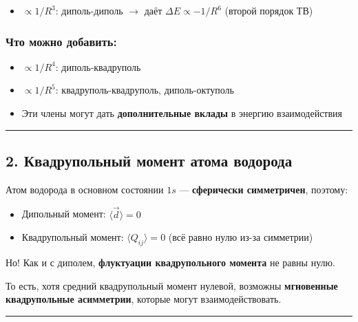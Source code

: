 \documentclass[11pt]{article}
\providecommand{\tightlist}{%
      \setlength{\itemsep}{0pt}\setlength{\parskip}{0pt}}
\begin{document}
\begin{itemize}
\tightlist
\item
  \(\propto 1/R^3\): диполь-диполь $\rightarrow$ даёт
  \(\Delta E \propto -1/R^6\) (второй порядок ТВ)
\end{itemize}

\subsubsection{Что можно
добавить:}\label{ux447ux442ux43e-ux43cux43eux436ux43dux43e-ux434ux43eux431ux430ux432ux438ux442ux44c}

\begin{itemize}
\tightlist
\item
  \(\propto 1/R^4\): диполь-квадруполь
\item
  \(\propto 1/R^5\): квадруполь-квадруполь, диполь-октуполь
\item
  Эти члены могут дать \textbf{дополнительные вклады} в энергию
  взаимодействия
\end{itemize}

\begin{center}\rule{0.5\linewidth}{\linethickness}\end{center}

\subsection{2. Квадрупольный момент атома
водорода}\label{ux43aux432ux430ux434ux440ux443ux43fux43eux43bux44cux43dux44bux439-ux43cux43eux43cux435ux43dux442-ux430ux442ux43eux43cux430-ux432ux43eux434ux43eux440ux43eux434ux430}

Атом водорода в основном состоянии \(1s\) --- \textbf{сферически
симметричен}, поэтому:

\begin{itemize}
\tightlist
\item
  Дипольный момент: \(\langle \vec{d} \rangle = 0\)
\item
  Квадрупольный момент: \(\langle Q_{ij} \rangle = 0\) (всё равно нулю
  из-за симметрии)
\end{itemize}

Но! Как и с диполем, \textbf{флуктуации квадрупольного момента} не равны
нулю.

То есть, хотя средний квадрупольный момент нулевой, возможны
\textbf{мгновенные квадрупольные асимметрии}, которые могут
взаимодействовать.

\begin{center}\rule{0.5\linewidth}{\linethickness}\end{center}
\end{document}
